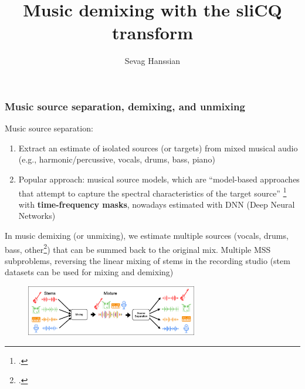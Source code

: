 \documentclass[usenames,dvipsnames]{beamer}
\title{Music demixing with the sliCQ transform}
\author{Sevag Hanssian}
\date{}
\begin{document}
\begin{frame}
\maketitle
\end{frame}

\begin{frame}
	\frametitle{Music source separation, demixing, and unmixing}
	Music source separation:
	\begin{enumerate}
		\item
			Extract an estimate of isolated sources (or targets) from mixed musical audio (e.g., harmonic/percussive, vocals, drums, bass, piano)
		\item
			Popular approach: musical source models, which are ``model-based approaches that attempt to capture the spectral characteristics of the target source'' \footcite[36]{musicsepgood} with \textbf{time-frequency masks}, nowadays estimated with DNN (Deep Neural Networks)
	\end{enumerate}
	In music demixing (or unmixing), we estimate multiple sources (vocals, drums, bass, other\footcite{musdb18hq}) that can be summed back to the original mix. Multiple MSS subproblems, reversing the linear mixing of stems in the recording studio (stem datasets can be used for mixing and demixing)
	\begin{figure}[ht]
		\centering
		\vspace{-0.5em}
		\includegraphics[width=7.5cm]{./images-mss/mixdemix.png}
	\end{figure}
\end{frame}
\end{document}
